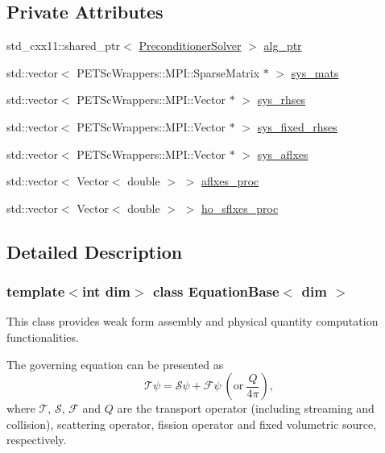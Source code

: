 \subsection*{Private Attributes}
\begin{DoxyCompactItemize}
\item 
std\+\_\+cxx11\+::shared\+\_\+ptr$<$ \hyperlink{class_preconditioner_solver}{Preconditioner\+Solver} $>$ \hyperlink{class_equation_base_aa4b83dfa34d4588cf3250a21ffc2e984}{alg\+\_\+ptr}
\item 
std\+::vector$<$ P\+E\+T\+Sc\+Wrappers\+::\+M\+P\+I\+::\+Sparse\+Matrix $\ast$ $>$ \hyperlink{class_equation_base_afcdb76718da046b950c466500de44a03}{sys\+\_\+mats}
\item 
std\+::vector$<$ P\+E\+T\+Sc\+Wrappers\+::\+M\+P\+I\+::\+Vector $\ast$ $>$ \hyperlink{class_equation_base_a89fe13a13fa7f46cc20bdab8a884216c}{sys\+\_\+rhses}
\item 
std\+::vector$<$ P\+E\+T\+Sc\+Wrappers\+::\+M\+P\+I\+::\+Vector $\ast$ $>$ \hyperlink{class_equation_base_a556e9d3b402dae0303e786e2ef38a29b}{sys\+\_\+fixed\+\_\+rhses}
\item 
std\+::vector$<$ P\+E\+T\+Sc\+Wrappers\+::\+M\+P\+I\+::\+Vector $\ast$ $>$ \hyperlink{class_equation_base_afe48e9f1d2f6b4f13cefe80d43d18300}{sys\+\_\+aflxes}
\item 
std\+::vector$<$ Vector$<$ double $>$ $>$ \hyperlink{class_equation_base_aa5a26770211dc6c8b2c17e35deffa60b}{aflxes\+\_\+proc}
\item 
std\+::vector$<$ Vector$<$ double $>$ $>$ \hyperlink{class_equation_base_a25123cf5f335e267799a52420396a276}{ho\+\_\+sflxes\+\_\+proc}
\end{DoxyCompactItemize}


\subsection{Detailed Description}
\subsubsection*{template$<$int dim$>$\newline
class Equation\+Base$<$ dim $>$}

This class provides weak form assembly and physical quantity computation functionalities. 

The governing equation can be presented as \[ \mathcal{T}\psi=\mathcal{S}\psi+\mathcal{F}\psi\ (\mathrm{or}\ \frac{Q}{4\pi}), \] where $\mathcal{T}$, $\mathcal{S}$, $\mathcal{F}$ and $Q$ are the transport operator (including streaming and collision), scattering operator, fission operator and fixed volumetric source, respectively.

